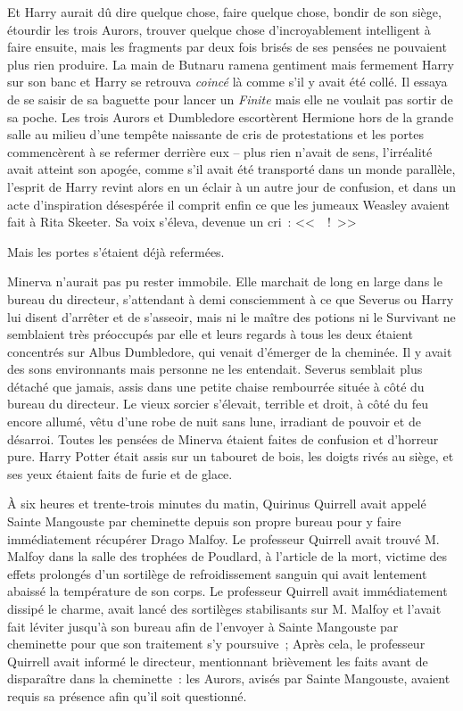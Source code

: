 Et Harry aurait dû dire quelque chose, faire quelque chose, bondir de son siège, étourdir les trois Aurors, trouver quelque chose d'incroyablement intelligent à faire ensuite, mais les fragments par deux fois brisés de ses pensées ne pouvaient plus rien produire. La main de Butnaru ramena gentiment mais fermement Harry sur son banc et Harry se retrouva \emph{coincé} là comme s'il y avait été collé. Il essaya de se saisir de sa baguette pour lancer un \emph{Finite} mais elle ne voulait pas sortir de sa poche. Les trois Aurors et Dumbledore escortèrent Hermione hors de la grande salle au milieu d'une tempête naissante de cris de protestations et les portes commencèrent à se refermer derrière eux -- plus rien n'avait de sens, l'irréalité avait atteint son apogée, comme s'il avait été transporté dans un monde parallèle, l'esprit de Harry revint alors en un éclair à un autre jour de confusion, et dans un acte d'inspiration désespérée il comprit enfin ce que les jumeaux Weasley avaient fait à Rita Skeeter. Sa voix s'éleva, devenue un cri~: <<~~!~>>

Mais les portes s'étaient déjà refermées.

\later

Minerva n'aurait pas pu rester immobile. Elle marchait de long en large dans le bureau du directeur, s'attendant à demi consciemment à ce que Severus ou Harry lui disent d'arrêter et de s'asseoir, mais ni le maître des potions ni le Survivant ne semblaient très préoccupés par elle et leurs regards à tous les deux étaient concentrés sur Albus Dumbledore, qui venait d'émerger de la cheminée. Il y avait des sons environnants mais personne ne les entendait. Severus semblait plus détaché que jamais, assis dans une petite chaise rembourrée située à côté du bureau du directeur. Le vieux sorcier s'élevait, terrible et droit, à côté du feu encore allumé, vêtu d'une robe de nuit sans lune, irradiant de pouvoir et de désarroi. Toutes les pensées de Minerva étaient faites de confusion et d'horreur pure. Harry Potter était assis sur un tabouret de bois, les doigts rivés au siège, et ses yeux étaient faits de furie et de glace.

À six heures et trente-trois minutes du matin, Quirinus Quirrell avait appelé Sainte Mangouste par cheminette depuis son propre bureau pour y faire immédiatement récupérer Drago Malfoy. Le professeur Quirrell avait trouvé M. Malfoy dans la salle des trophées de Poudlard, à l'article de la mort, victime des effets prolongés d'un sortilège de refroidissement sanguin qui avait lentement abaissé la température de son corps. Le professeur Quirrell avait immédiatement dissipé le charme, avait lancé des sortilèges stabilisants sur M. Malfoy et l'avait fait léviter jusqu'à son bureau afin de l'envoyer à Sainte Mangouste par cheminette pour que son traitement s'y poursuive~; Après cela, le professeur Quirrell avait informé le directeur, mentionnant brièvement les faits avant de disparaître dans la cheminette~: les Aurors, avisés par Sainte Mangouste, avaient requis sa présence afin qu'il soit questionné.

